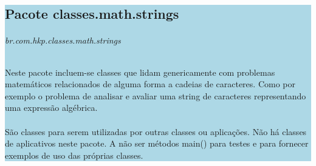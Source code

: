 \documentclass[a4paper,12pt,openany]{book}
\begin{document}
\colorbox{lightblue}{
	
	\begin{minipage}{18cm}
		
		\part*{Pacote classes.math.strings}
		
		\paragraph{br.com.hkp.classes.math.strings}
		
		Neste pacote incluem-se classes que lidam genericamente com problemas matemáticos relacionados de alguma forma a cadeias de caracteres. Como por exemplo o problema de analisar e avaliar uma string de caracteres representando uma expressão algébrica.
		\\
		\\
		São classes para serem utilizadas por outras classes ou aplicações. Não há classes de aplicativos neste pacote. A não ser métodos main() para testes e para fornecer exemplos de uso das próprias classes.
		
	\end{minipage}
	
}%

\newpage

\end{document}
